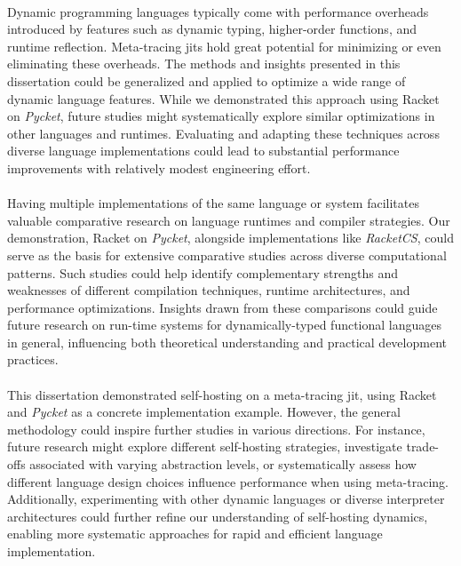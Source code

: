         \paragraph{}%
            Dynamic programming languages typically come with performance overheads introduced by features such as dynamic typing, higher-order functions, and runtime reflection. Meta-tracing \glspl{jit} hold great potential for minimizing or even eliminating these overheads. The methods and insights presented in this dissertation could be generalized and applied to optimize a wide range of dynamic language features. While we demonstrated this approach using Racket on \emph{Pycket}, future studies might systematically explore similar optimizations in other languages and runtimes. Evaluating and adapting these techniques across diverse language implementations could lead to substantial performance improvements with relatively modest engineering effort.

        \paragraph{}%
            Having multiple implementations of the same language or system facilitates valuable comparative research on language runtimes and compiler strategies. Our demonstration, Racket on \emph{Pycket}, alongside implementations like \emph{RacketCS}, could serve as the basis for extensive comparative studies across diverse computational patterns. Such studies could help identify complementary strengths and weaknesses of different compilation techniques, runtime architectures, and performance optimizations. Insights drawn from these comparisons could guide future research on run-time systems for dynamically-typed functional languages in general, influencing both theoretical understanding and practical development practices.

        \paragraph{}%
            This dissertation demonstrated self-hosting on a meta-tracing \gls{jit}, using Racket and \emph{Pycket} as a concrete implementation example. However, the general methodology could inspire further studies in various directions. For instance, future research might explore different self-hosting strategies, investigate trade-offs associated with varying abstraction levels, or systematically assess how different language design choices influence performance when using meta-tracing. Additionally, experimenting with other dynamic languages or diverse interpreter architectures could further refine our understanding of self-hosting dynamics, enabling more systematic approaches for rapid and efficient language implementation.

